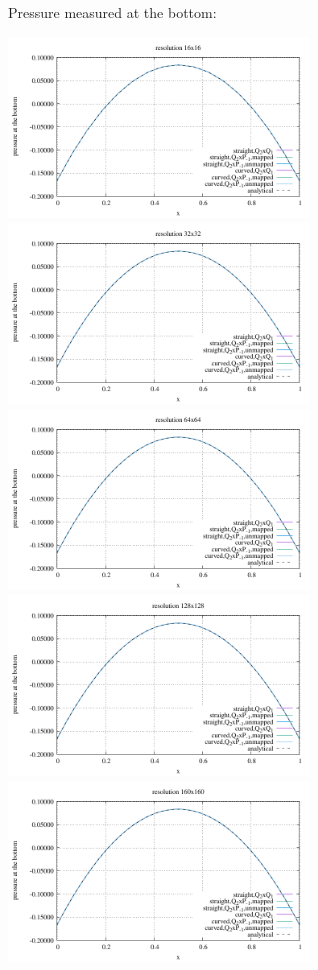 \newpage
Pressure measured at the bottom:
\begin{center}
\includegraphics[width=8cm]{python_codes/fieldstone_25/results/doneahuerta/pbottom16.pdf}
\includegraphics[width=8cm]{python_codes/fieldstone_25/results/doneahuerta/pbottom32.pdf}\\
\includegraphics[width=8cm]{python_codes/fieldstone_25/results/doneahuerta/pbottom64.pdf}
\includegraphics[width=8cm]{python_codes/fieldstone_25/results/doneahuerta/pbottom128.pdf}\\
\includegraphics[width=8cm]{python_codes/fieldstone_25/results/doneahuerta/pbottom160.pdf}
\end{center}


